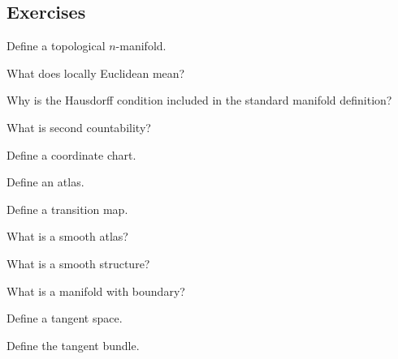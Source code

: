 \subsection{Exercises}
\label{subsec:manifolds-exercises}

\begin{exercise}[1]
Define a topological \(n\)-manifold.
\end{exercise}

\begin{exercise}[1]
What does locally Euclidean mean?
\end{exercise}

\begin{exercise}[1]
Why is the Hausdorff condition included in the standard manifold
definition?
\end{exercise}

\begin{exercise}[1]
What is second countability?
\end{exercise}

\begin{exercise}[1]
Define a coordinate chart.
\end{exercise}

\begin{exercise}[1]
Define an atlas.
\end{exercise}

\begin{exercise}[1]
Define a transition map.
\end{exercise}

\begin{exercise}[1]
What is a smooth atlas?
\end{exercise}

\begin{exercise}[1]
What is a smooth structure?
\end{exercise}

\begin{exercise}[1]
What is a manifold with boundary?
\end{exercise}

\begin{exercise}[1]
Define a tangent space.
\end{exercise}

\begin{exercise}[1]
Define the tangent bundle.
\end{exercise}

